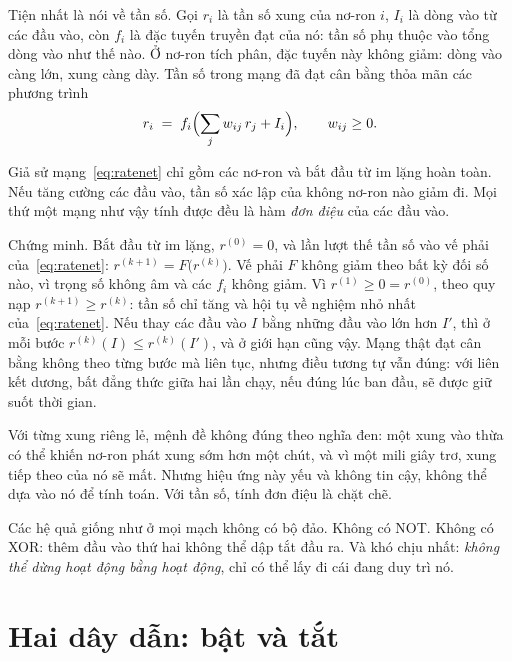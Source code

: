 Tiện nhất là nói về tần số. Gọi $r_i$ là tần số xung của nơ-ron $i$, $I_i$ là dòng vào từ các đầu vào, còn $f_i$ là đặc tuyến truyền đạt của nó: tần số phụ thuộc vào tổng dòng vào như thế nào. Ở nơ-ron tích phân, đặc tuyến này không giảm: dòng vào càng lớn, xung càng dày. Tần số trong mạng đã đạt cân bằng thỏa mãn các phương trình
\begin{equation}
r_i \;=\; f_i\Bigl(\sum_j w_{ij}\,r_j + I_i\Bigr), \qquad w_{ij}\ge 0 .
\label{eq:ratenet}
\end{equation}

\begin{keyblock}
\begin{proposition}
\label{prop:monotone}
Giả sử mạng~\eqref{eq:ratenet} chỉ gồm các nơ-ron  và bắt đầu từ im lặng hoàn toàn. Nếu tăng cường các đầu vào, tần số xác lập của không nơ-ron nào giảm đi. Mọi thứ một mạng như vậy tính được đều là hàm \emph{đơn điệu} của các đầu vào.
\end{proposition}
\end{keyblock}

Chứng minh. Bắt đầu từ im lặng, $r^{(0)}=0$, và lần lượt thế tần số vào vế phải của~\eqref{eq:ratenet}: $r^{(k+1)}=F\bigl(r^{(k)}\bigr)$. Vế phải $F$ không giảm theo bất kỳ đối số nào, vì trọng số không âm và các $f_i$ không giảm. Vì $r^{(1)}\ge0=r^{(0)}$, theo quy nạp $r^{(k+1)}\ge r^{(k)}$: tần số chỉ tăng và hội tụ về nghiệm nhỏ nhất của~\eqref{eq:ratenet}. Nếu thay các đầu vào $I$ bằng những đầu vào lớn hơn $I'$, thì ở mỗi bước $r^{(k)}(I)\le r^{(k)}(I')$, và ở giới hạn cũng vậy. Mạng thật đạt cân bằng không theo từng bước mà liên tục, nhưng điều tương tự vẫn đúng: với liên kết dương, bất đẳng thức giữa hai lần chạy, nếu đúng lúc ban đầu, sẽ được giữ suốt thời gian.

Với từng xung riêng lẻ, mệnh đề không đúng theo nghĩa đen: một xung vào thừa có thể khiến nơ-ron phát xung sớm hơn một chút, và vì một mili giây trơ, xung tiếp theo của nó sẽ mất. Nhưng hiệu ứng này yếu và không tin cậy, không thể dựa vào nó để tính toán. Với tần số, tính đơn điệu là chặt chẽ.

Các hệ quả giống như ở mọi mạch không có bộ đảo. Không có NOT. Không có XOR: thêm đầu vào thứ hai không thể dập tắt đầu ra. Và khó chịu nhất: \emph{không thể dừng hoạt động bằng hoạt động}, chỉ có thể lấy đi cái đang duy trì nó.

\section{Hai dây dẫn: bật và tắt}

